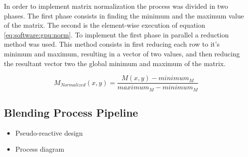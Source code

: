 	    In order to implement matrix normalization the process was divided in two phases. The first phase consists in finding the minimum and the maximum value of the matrix. The second is the element-wise execution of equation \ref{eq:software:gpu:norm}. To implement the first phase in parallel a reduction method was used. This method consists in first reducing each row to it's minimum and maximum, resulting in a vector of two values, and then reducing the resultant vector two the global minimum and maximum of the matrix.
	    
	    \begin{equation} \label{eq:software:gpu:norm}
		  M_{Normalized}(x, y) = \frac{M(x, y) - minimum_M}{maximum_M - minimum_M}
	    \end{equation}
	    
    \subsection {Blending Process Pipeline} %
    
      \begin{itemize}
      	\item Pseudo-reactive design
      	\item Process diagram
      \end{itemize}